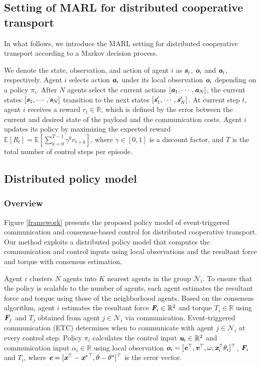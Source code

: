\documentclass[letterpaper, 10 pt, conference]{ieeeconf} %
\begin{document}
\subsection{Setting of MARL for distributed cooperative transport}
In what follows, we introduce the MARL setting for distributed cooperative transport according to a Markov decision process.

We denote the state, observation, and action of agent $i$ as $\textit{\textbf{s}}_i$, $\textit{\textbf{o}}_i$ and $\textit{\textbf{a}}_i$, respectively.
Agent $i$ selects action $\textit{\textbf{a}}_i$ under its local observation $\textit{\textbf{o}}_i$ depending on a policy $\pi_i$.
After $N$ agents select the current actions $[\textit{\textbf{a}}_1,\cdots,\textit{\textbf{a}}_N]$, the current states $[\textit{\textbf{s}}_1,\cdots,\textit{\textbf{s}}_N]$ transition to the next states $[\textit{\textbf{s}}'_1,\cdots,\textit{\textbf{s}}'_N]$.
At current step $t$, agent $i$ receives a reward $r_t\in \mathbb{R}$, which is defined by the error between the current and desired state of the payload and the communication costs.
Agent $i$ updates its policy by maximizing the expected reward $\mathbb{E}[R_t]=\mathbb{E}\left[\sum^{T-1}_{k=0}\gamma^{k}r_{t+k}\right]$, where $\gamma \in [0, 1]$ is a discount factor, and $T$ is the total number of control steps per episode.

\subsection{Distributed policy model}
\subsubsection{Overview}
Figure \ref{framework} presents the proposed policy model of event-triggered communication and consensus-based control for distributed
cooperative transport.
Our method exploits a distributed policy model that computes the communication and control inputs using local observations and the
resultant force and torque with consensus estimation.

Agent $i$ clusters $N$ agents into $K$ nearest agents in the group $\mathcal{N}_i$.
To ensure that the policy is scalable to the number of agents, each agent estimates the resultant force and torque using those of the neighborhood
agents.
Based on the consensus algorithm, agent $i$ estimates the resultant force $\textit{\textbf{F}}_i\in \mathbb{R}^2$ and torque $T_i\in \mathbb{R}$ using $\textit{\textbf{F}}_j$ and $T_j$ obtained from agent $j\in \mathcal{N}_i$ via communication.
Event-triggered communication (ETC) determines when to communicate with agent $j\in \mathcal{N}_i$ at every control step.
Policy $\pi_i$ calculates the control input $\textit{\textbf{u}}_i\in \mathbb{R}^2$ and communication input $\alpha_i\in \mathbb{R}$ using local
observation $\textit{\textbf{o}}_i=[\textit{\textbf{e}}^{\top},\textit{\textbf{v}}^{\top},\omega,\textit{\textbf{x}}_i^{\top}\theta_i]^{\top}$, $\textit{\textbf{F}}_i$ and $T_i$, where $\textit{\textbf{e}}=[\textit{\textbf{x}}^{\top}-{\textit{\textbf{x}}^{\ast}}^{\top},\theta-\theta^{\ast}]^{\top}$ is the error vector.
\end{document}

